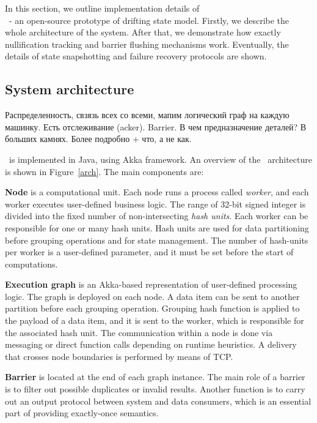 
\label {fs-consistency-section}

In this section, we outline implementation details of \\ 
\FlameStream\ - an open-source prototype of drifting state model. Firstly, we describe the whole architecture of the system. After that, we demonstrate how exactly nullification tracking and barrier flushing mechanisms work. Eventually, the details of state snapshotting and failure recovery protocols are shown. 

\subsection{System architecture}

Распределенность, свзязь всех со всеми, мапим логический граф на каждую машинку. Есть отслеживание (acker). Barrier. В чем предназначение деталей? В больших камнях. Более подробно + что, а не как.

\FlameStream\ is implemented in Java, using Akka framework. An overview of the \FlameStream\ architecture is shown in Figure~\ref{arch}. The main components are:

{\bf Node} is a computational unit. Each node runs a process called {\it worker}, and each worker executes user-defined business logic. The range of 32-bit signed integer is divided into the fixed number of non-intersecting {\it hash units}. Each worker can be responsible for one or many hash units. Hash units are used for data partitioning before grouping operations and for state management. The number of hash-units per worker is a user-defined parameter, and it must be set before the start of computations. 

{\bf Execution graph} is an Akka-based representation of user-defined processing logic. The graph is deployed on each node. A data item can be sent to another partition before each grouping operation. Grouping hash function is applied to the payload of a data item, and it is sent to the worker, which is responsible for the associated hash unit. The communication within a node is done via messaging or direct function calls depending on runtime heuristics. A delivery that crosses node boundaries is performed by means of TCP.

{\bf Barrier} is located at the end of each graph instance. The main role of a barrier is to filter out possible duplicates or invalid results. Another function is to carry out an output protocol between system and data consumers, which is an essential part of providing exactly-once semantics.

